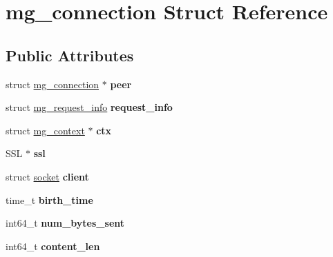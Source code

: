 \hypertarget{structmg__connection}{\section{mg\-\_\-connection Struct Reference}
\label{structmg__connection}
}
\subsection*{Public Attributes}
\begin{DoxyCompactItemize}
\item 
\hypertarget{structmg__connection_af4e20e1d091f7dbce4c68075b067948f}{struct \hyperlink{structmg__connection}{mg\-\_\-connection} $\ast$ {\bfseries peer}}\label{structmg__connection_af4e20e1d091f7dbce4c68075b067948f}

\item 
\hypertarget{structmg__connection_ab2c448b0d885bca25578872ca4362c89}{struct \hyperlink{structmg__request__info}{mg\-\_\-request\-\_\-info} {\bfseries request\-\_\-info}}\label{structmg__connection_ab2c448b0d885bca25578872ca4362c89}

\item 
\hypertarget{structmg__connection_ae5e51df4d11b955f3153d9581a267a75}{struct \hyperlink{structmg__context}{mg\-\_\-context} $\ast$ {\bfseries ctx}}\label{structmg__connection_ae5e51df4d11b955f3153d9581a267a75}

\item 
\hypertarget{structmg__connection_ac376c70a4f827896a0152d704233424b}{S\-S\-L $\ast$ {\bfseries ssl}}\label{structmg__connection_ac376c70a4f827896a0152d704233424b}

\item 
\hypertarget{structmg__connection_a6a9f2b9d1087412cac4187ce5a44d274}{struct \hyperlink{structsocket}{socket} {\bfseries client}}\label{structmg__connection_a6a9f2b9d1087412cac4187ce5a44d274}

\item 
\hypertarget{structmg__connection_a14395e56adc28e7e7a635ad08999fbf5}{time\-\_\-t {\bfseries birth\-\_\-time}}\label{structmg__connection_a14395e56adc28e7e7a635ad08999fbf5}

\item 
\hypertarget{structmg__connection_a482f3e0e76b5e4b885c971ab232f7653}{int64\-\_\-t {\bfseries num\-\_\-bytes\-\_\-sent}}\label{structmg__connection_a482f3e0e76b5e4b885c971ab232f7653}

\item 
\hypertarget{structmg__connection_a168cfc671a07bf2360ae806193c015bc}{int64\-\_\-t {\bfseries content\-\_\-len}}\label{structmg__connection_a168cfc671a07bf2360ae806193c015bc}


\end{DoxyCompactItemize}
